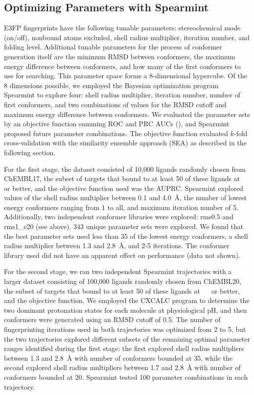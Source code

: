 \documentclass[../../main.tex]{subfiles}
\begin{document}
\begin{refsection}
	\subsection*{Optimizing Parameters with Spearmint}

	E3FP fingerprints have the following tunable parameters: stereochemical mode (on/off), nonbound atoms excluded, shell radius multiplier, iteration number, and folding level.
	Additional tunable parameters for the process of conformer generation itself are the minimum RMSD between conformers, the maximum energy difference between conformers, and how many of the first conformers to use for searching.
	This parameter space forms a 8-dimensional hypercube.
	Of the 8 dimensions possible, we employed the Bayesian optimization program Spearmint  \supercite{snoek_2012} to explore four: shell radius multiplier, iteration number, number of first conformers, and two combinations of values for the RMSD cutoff and maximum energy difference between conformers.
	We evaluated the parameter sets by an objective function summing ROC and PRC AUCs (\AUCsum{}), and Spearmint proposed future parameter combinations.
	The objective function evaluated $k$-fold cross-validation with the similarity ensemble approach (SEA) as described in the following section.

	For the first stage, the dataset consisted of 10,000 ligands randomly chosen from ChEMBL17, the subset of targets that bound to at least 50 of these ligands at \SI{}{\micro\molar} or better, and the objective function used was the AUPRC.
	Spearmint explored values of the shell radius multiplier between 0.1 and \SI{4.0}{\angstrom}, the number of lowest energy conformers ranging from 1 to all, and maximum iteration number of 5.
	Additionally, two independent conformer libraries were explored: rms0.5 and rms1\_e20 (see above).
	343 unique parameter sets were explored.
	We found that the best parameter sets used less than 35 of the lowest energy conformers, a shell radius multiplier between 1.3 and \SI{2.8}{\angstrom}, and 2-5 iterations.
	The conformer library used did not have an apparent effect on performance  (data not shown).

	For the second stage, we ran two independent Spearmint trajectories with a larger dataset consisting of 100,000 ligands randomly chosen from ChEMBL20, the subset of targets that bound to at least 50 of these ligands at \SI{}{\micro\molar} or better, and the \AUCsum{} objective function.
	We employed the CXCALC program \supercite{chemaxon_software_2015} to determine the two dominant protonation states for each molecule at physiological pH, and then conformers were generated using an RMSD cutoff of 0.5.
	The number of fingerprinting iterations used in both trajectories was optimized from 2 to 5, but the two trajectories explored different subsets of the remaining optimal parameter ranges identified during the first stage: the first explored shell radius multipliers between 1.3 and \SI{2.8}{\angstrom} with number of conformers bounded at 35, while the second explored shell radius multipliers between 1.7 and  \SI{2.8}{\angstrom} with number of conformers bounded at 20.
	Spearmint tested 100 parameter combinations in each trajectory.


\end{refsection}
\end{document}
